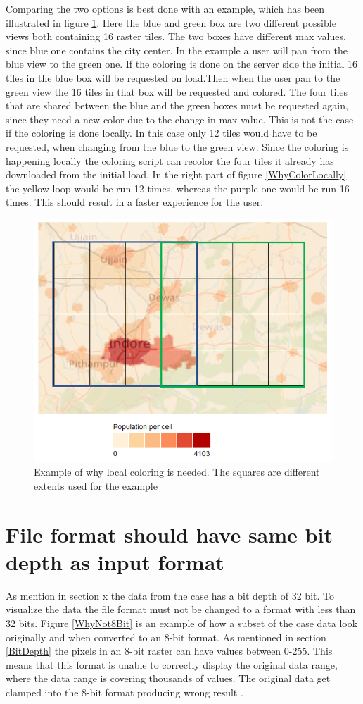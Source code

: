 Comparing the two options is best done with an example, which has been illustrated in figure \ref{WhyColorLocallyMap}. Here the blue and green box are two different possible views both containing 16 raster tiles. The two boxes have different max values, since blue one contains the city center. In the example a user will pan from the blue view to the green one. If the coloring is done on the server side the initial 16 tiles in the blue box will be requested on load.Then when the user pan to the green view the 16 tiles in that box will be requested and colored. The four tiles that are shared between the blue and the green boxes must be requested again, since they need a new color due to the change in max value. This is not the case if the coloring is done locally. In this case only 12 tiles would have to be requested, when changing from the blue to the green view. Since the coloring is happening locally the coloring script can recolor the four tiles it already has downloaded from the initial load.  In the right part of figure \ref{WhyColorLocally} the yellow loop would be run 12 times, whereas the purple one would be run 16 times. This should result in a faster experience for the user.

\begin{figure} [H]
	\centering
	\includegraphics[width=.6\textwidth]{Pictures/WhyColorLocallyMap}
	\caption{Example of why local coloring is needed. The squares are different extents used for the example}
	\label{WhyColorLocallyMap}
\end{figure}

\section{File format should have same bit depth as input format}\label{NeededDepth}
As mention in section x the data from the case has a bit depth of 32 bit. To visualize the data the file format must not be changed to a format with less than 32 bits. Figure \ref{WhyNot8Bit} is an example of how a subset of the case data look originally and when converted to an 8-bit format. As mentioned in section \ref{BitDepth} the pixels in an 8-bit raster can have values between 0-255. This means that this format is unable to correctly display the original data range, where the data range is covering thousands of values. The original data get clamped into the 8-bit format producing wrong result
\citep{gdal2tilesDoc} .

